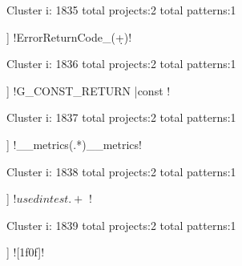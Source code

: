 Cluster i: 1835
total projects:2
total patterns:1
\begin{multicols}{1}
\begin{description}[noitemsep,topsep=0pt]
\item [[2] ] \cverb!ErrorReturnCode_(\d+)!
\end{description}
\end{multicols}







Cluster i: 1836
total projects:2
total patterns:1
\begin{multicols}{1}
\begin{description}[noitemsep,topsep=0pt]
\item [[2] ] \cverb!G_CONST_RETURN |const !
\end{description}
\end{multicols}







Cluster i: 1837
total projects:2
total patterns:1
\begin{multicols}{1}
\begin{description}[noitemsep,topsep=0pt]
\item [[2] ] \cverb!__metrics(.*)__metrics!
\end{description}
\end{multicols}







Cluster i: 1838
total projects:2
total patterns:1
\begin{multicols}{1}
\begin{description}[noitemsep,topsep=0pt]
\item [[2] ] \cverb!\(used in test .+\) !
\end{description}
\end{multicols}







Cluster i: 1839
total projects:2
total patterns:1
\begin{multicols}{1}
\begin{description}[noitemsep,topsep=0pt]
\item [[2] ] \cverb![\x1f\x0f]!
\end{description}
\end{multicols}







